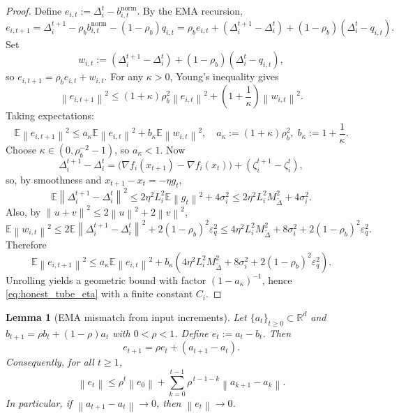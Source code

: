 \documentclass[11pt,a4paper]{article}
\newtheorem{lemma}{Lemma}
\theoremstyle{remark}
\newcommand{\R}{\mathbb{R}}
\newcommand{\E}{\mathbb{E}}
\newcommand{\norm}[1]{\left\lVert #1 \right\rVert}
\begin{document}
\begin{proof}
Define \(e_{i,t}:=\Delta_i^t-b_{i,t}^{\mathrm{norm}}\). By the EMA recursion,
\[
    e_{i,t+1}
    =
    \Delta_i^{t+1}
    -
    \rho_b b_{i,t}^{\mathrm{norm}}
    -
    (1-\rho_b)q_{i,t}
    =
    \rho_b e_{i,t}
    +
    (\Delta_i^{t+1}-\Delta_i^t)
    +
    (1-\rho_b)(\Delta_i^t-q_{i,t}).
\]
Set
\[
    w_{i,t}
    :=
    (\Delta_i^{t+1}-\Delta_i^t)
    +
    (1-\rho_b)(\Delta_i^t-q_{i,t}),
\]
so \(e_{i,t+1}=\rho_b e_{i,t}+w_{i,t}\).
For any \(\kappa>0\), Young's inequality gives
\[
    \norm{e_{i,t+1}}^2
    \le
    (1+\kappa)\rho_b^2\norm{e_{i,t}}^2
    +
    \left(1+\frac1\kappa\right)\norm{w_{i,t}}^2.
\]
Taking expectations:
\[
    \E\norm{e_{i,t+1}}^2
    \le
    a_\kappa \E\norm{e_{i,t}}^2
    +
    b_\kappa \E\norm{w_{i,t}}^2,
    \quad
    a_\kappa:=(1+\kappa)\rho_b^2,\;
    b_\kappa:=1+\frac1\kappa.
\]
Choose \(\kappa\in(0,\rho_b^{-2}-1)\), so \(a_\kappa<1\).
Now
\[
    \Delta_i^{t+1}-\Delta_i^t
    =
    \bigl(\nabla f_i(x_{t+1})-\nabla f_i(x_t)\bigr)
    +
    (\zeta_i^{t+1}-\zeta_i^t),
\]
so, by smoothness and \(x_{t+1}-x_t=-\eta g_t\),
\[
    \E\norm{\Delta_i^{t+1}-\Delta_i^t}^2
    \le
    2\eta^2L_i^2\E\norm{g_t}^2 + 4\sigma_i^2
    \le
    2\eta^2L_i^2 M_{\tilde\Delta}^2 + 4\sigma_i^2.
\]
Also, by \(\norm{u+v}^2\le 2\norm u^2+2\norm v^2\),
\[
    \E\norm{w_{i,t}}^2
    \le
    2\E\norm{\Delta_i^{t+1}-\Delta_i^t}^2
    +
    2(1-\rho_b)^2\varepsilon_q^2
    \le
    4\eta^2L_i^2M_{\tilde\Delta}^2 + 8\sigma_i^2 + 2(1-\rho_b)^2\varepsilon_q^2.
\]
Therefore
\[
    \E\norm{e_{i,t+1}}^2
    \le
    a_\kappa \E\norm{e_{i,t}}^2
    +
    b_\kappa\!\left(
        4\eta^2L_i^2M_{\tilde\Delta}^2 + 8\sigma_i^2 + 2(1-\rho_b)^2\varepsilon_q^2
    \right).
\]
Unrolling yields a geometric bound with factor \((1-a_\kappa)^{-1}\), hence
\eqref{eq:honest_tube_eta} with a finite constant \(C_i\).
\end{proof}

\begin{lemma}[EMA mismatch from input increments]
\label{lem:ema_increment_mismatch}
Let \(\{a_t\}_{t\ge 0}\subset\R^d\) and
\(
b_{t+1}=\rho b_t+(1-\rho)a_t
\)
with \(0<\rho<1\). Define \(e_t:=a_t-b_t\). Then
\begin{equation}
    e_{t+1}=\rho e_t + (a_{t+1}-a_t).
    \label{eq:ema_error_recursion}
\end{equation}
Consequently, for all \(t\ge 1\),
\begin{equation}
    \norm{e_t}
    \le
    \rho^t\norm{e_0}
    +
    \sum_{k=0}^{t-1}\rho^{\,t-1-k}\norm{a_{k+1}-a_k}.
    \label{eq:ema_error_unroll}
\end{equation}
In particular, if \(\norm{a_{t+1}-a_t}\to 0\), then \(\norm{e_t}\to 0\).
\end{lemma}
\end{document}
